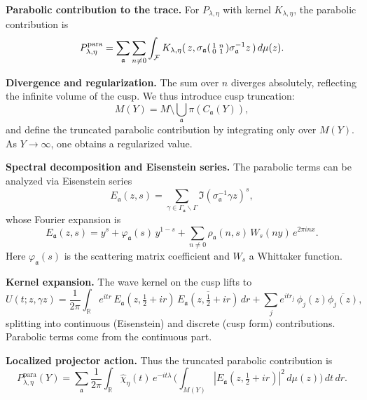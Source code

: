 \medskip

\noindent\textbf{Parabolic contribution to the trace.}
For $P_{\lambda,\eta}$ with kernel $K_{\lambda,\eta}$,
the parabolic contribution is
\[
  P_{\lambda,\eta}^{\text{para}}
  = \sum_{\mathfrak{a}} \sum_{n\neq 0} \int_{\mathcal{F}}
  K_{\lambda,\eta}(\,z, \sigma_\mathfrak{a}
  \begin{psmallmatrix} 1 & n \\ 0 & 1 \end{psmallmatrix} \sigma_\mathfrak{a}^{-1} z\,)\, d\mu(z).
\]

\medskip

\noindent\textbf{Divergence and regularization.}
The sum over $n$ diverges absolutely, reflecting the infinite volume of the cusp.
We thus introduce cusp truncation:
\[
  M(Y) = M \setminus \bigcup_{\mathfrak{a}} \pi(C_\mathfrak{a}(Y)),
\]
and define the truncated parabolic contribution by integrating only over $M(Y)$.
As $Y\to\infty$, one obtains a regularized value.

\medskip

\noindent\textbf{Spectral decomposition and Eisenstein series.}
The parabolic terms can be analyzed via Eisenstein series
\[
  E_\mathfrak{a}(z,s) = \sum_{\gamma\in \Gamma_\mathfrak{a}\backslash \Gamma}
  \Im(\sigma_\mathfrak{a}^{-1}\gamma z)^s,
\]
whose Fourier expansion is
\[
  E_\mathfrak{a}(z,s) = y^s + \varphi_\mathfrak{a}(s)\, y^{1-s}
  + \sum_{n\neq 0} \rho_\mathfrak{a}(n,s)\, W_s(ny)\, e^{2\pi i n x}.
\]
Here $\varphi_\mathfrak{a}(s)$ is the scattering matrix coefficient and $W_s$ a Whittaker function.

\medskip

\noindent\textbf{Kernel expansion.}
The wave kernel on the cusp lifts to
\[
  U(t;z,\gamma z) =
  \frac{1}{2\pi}\int_{\mathbb{R}} e^{itr}\, E_\mathfrak{a}(z,\tfrac12+ir)\,
  \overline{E_\mathfrak{a}(z,\tfrac12+ir)}\, dr
  + \sum_j e^{it r_j}\, \phi_j(z)\overline{\phi_j(z)},
\]
splitting into continuous (Eisenstein) and discrete (cusp form) contributions.
Parabolic terms come from the continuous part.

\medskip

\noindent\textbf{Localized projector action.}
Thus the truncated parabolic contribution is
\[
  P_{\lambda,\eta}^{\text{para}}(Y)
  = \sum_\mathfrak{a} \frac{1}{2\pi}\int_\mathbb{R}
  \widehat{\chi}_\eta(t)\, e^{-it\lambda}\,
  \Big( \int_{M(Y)} |E_\mathfrak{a}(z,\tfrac12+ir)|^2\, d\mu(z)\Big)\, dt\, dr.
\]

\medskip

